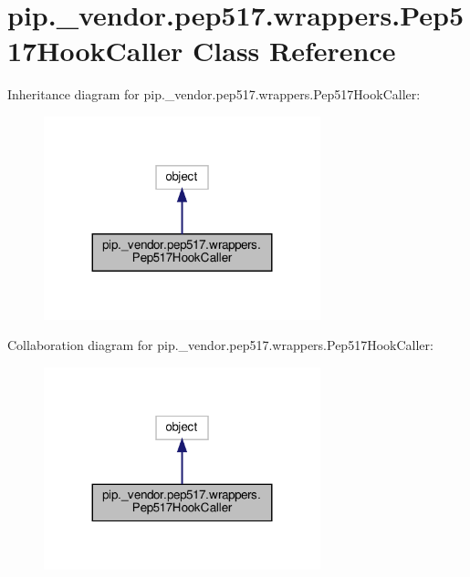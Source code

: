 \hypertarget{classpip_1_1__vendor_1_1pep517_1_1wrappers_1_1Pep517HookCaller}{}\section{pip.\+\_\+vendor.\+pep517.\+wrappers.\+Pep517\+Hook\+Caller Class Reference}
\label{classpip_1_1__vendor_1_1pep517_1_1wrappers_1_1Pep517HookCaller}


Inheritance diagram for pip.\+\_\+vendor.\+pep517.\+wrappers.\+Pep517\+Hook\+Caller\+:
\nopagebreak
\begin{figure}[H]
\begin{center}
\leavevmode
\includegraphics[width=227pt]{classpip_1_1__vendor_1_1pep517_1_1wrappers_1_1Pep517HookCaller__inherit__graph}
\end{center}
\end{figure}


Collaboration diagram for pip.\+\_\+vendor.\+pep517.\+wrappers.\+Pep517\+Hook\+Caller\+:
\nopagebreak
\begin{figure}[H]
\begin{center}
\leavevmode
\includegraphics[width=227pt]{classpip_1_1__vendor_1_1pep517_1_1wrappers_1_1Pep517HookCaller__coll__graph}
\end{center}
\end{figure}

